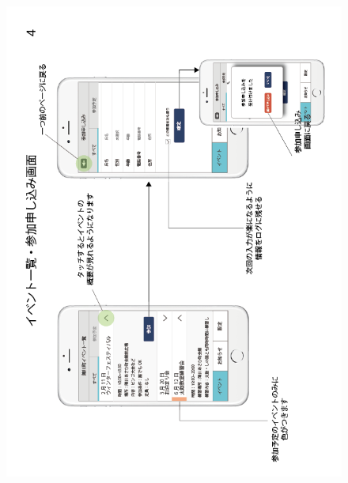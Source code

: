 \begin{figure}[h]
    \begin{center}
    \includegraphics[keepaspectratio, scale=0.7]{appendixs/appendixB_figres/fig4.png}
    \end{center}
\end{figure}

